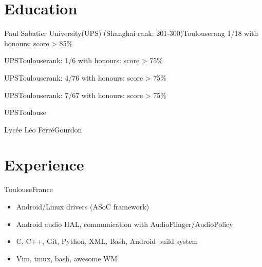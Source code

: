 \documentclass[a4paper,11pt]{moderncv}
\begin{document}
\maketitle

\section{Education}
{Paul Sabatier University(UPS) (Shanghai rank: 201-300)}{Toulouse}{rang 1/18}
{
    with honours: score > 85\%
}

{UPS}{Toulouse}{rank: 1/6}
{
    with honours: score > 75\%
}

{UPS}{Toulouse}{rank: 4/76}
{
    with honours: score > 75\%
}

{UPS}{Toulouse}{rank: 7/67}
{
    with honours: score > 75\%
}

{UPS}{Toulouse}{}
{
}

{Lycée Léo Ferré}{Gourdon}{}
{}


\section{Experience}

{Toulouse}{France}
{
    \begin{itemize}
        \item Android/Linux drivers (ASoC framework)
        \item Android audio HAL, communication with AudioFlinger/AudioPolicy
        \item C, C++, Git, Python, XML, Bash, Android build system
        \item Vim, tmux, bash, awesome WM
    \end{itemize}
}
\end{document}
